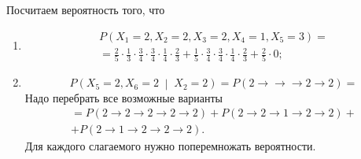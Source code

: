 Посчитаем вероятность того, что
\begin{enumerate}[label=\alph*)]
  \item \begin{gather*}
    P \left( X_1 = 2, X_2 = 2, X_3 = 2, X_4 = 1, X_5 = 3 \right) = \\
    = \frac{2}{5} \cdot \frac{1}{3} \cdot \frac{3}{4} \cdot \frac{3}{4} \cdot \frac{1}{4} \cdot
    \frac{2}{3} +
    \frac{1}{5} \cdot \frac{3}{4} \cdot \frac{3}{4} \cdot \frac{1}{4} \cdot \frac{2}{3} +
    \frac{2}{5} \cdot 0;
  \end{gather*}
  \item \begin{equation*}
    P \left( X_5 = 2, X_6 = 2 \; \middle| \; X_2 = 2 \right) =
    P \left( 2 \to \to \to 2 \to 2 \right) =
  \end{equation*}
  Надо перебрать все возможные варианты
  \begin{gather*}
    = P \left( 2 \to 2 \to 2 \to 2 \to 2 \right) + P \left( 2 \to 2 \to 1 \to 2 \to 2 \right) + \\
    + P \left( 2 \to 1 \to 2 \to 2 \to 2 \right).
  \end{gather*}
  Для каждого слагаемого нужно поперемножать вероятности.
\end{enumerate}
